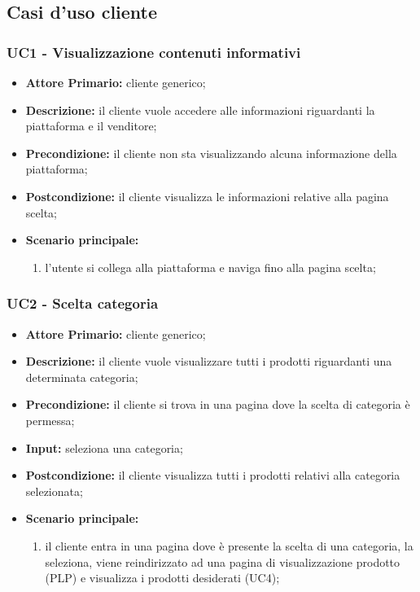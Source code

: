 \subsection{Casi d'uso cliente}
\subsubsection{UC1 - Visualizzazione contenuti informativi}
\begin{itemize}
    \item \textbf{Attore Primario:} cliente generico;
    \item \textbf{Descrizione:} il cliente vuole accedere alle informazioni riguardanti la piattaforma e il venditore;
    \item \textbf{Precondizione:} il cliente non sta visualizzando alcuna informazione della piattaforma;
    \item \textbf{Postcondizione:} il cliente visualizza le informazioni relative alla pagina scelta;
    \item \textbf{Scenario principale:}
    \begin{enumerate}
        \item l'utente si collega alla piattaforma e naviga fino alla pagina scelta;
    \end{enumerate}
\end{itemize}

\subsubsection{UC2 - Scelta categoria}
\begin{itemize}
    \item \textbf{Attore Primario:} cliente generico;
    \item \textbf{Descrizione:} il cliente vuole visualizzare tutti i prodotti riguardanti una determinata categoria;
    \item \textbf{Precondizione:} il cliente si trova in una pagina dove la scelta di categoria è permessa;
    \item \textbf{Input:} seleziona una categoria;
    \item \textbf{Postcondizione:} il cliente visualizza tutti i prodotti relativi alla categoria selezionata;
    \item \textbf{Scenario principale:}
    \begin{enumerate}
        \item il cliente entra in una pagina dove è presente la scelta di una categoria, la seleziona, viene reindirizzato ad una pagina di visualizzazione prodotto (PLP) e visualizza i prodotti desiderati (UC4);
    \end{enumerate}
\end{itemize}

